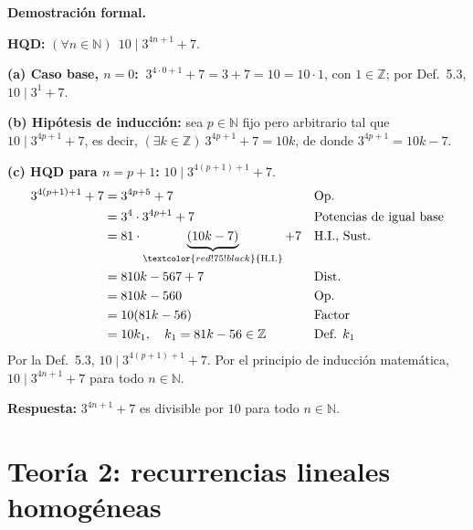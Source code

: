 \documentclass[11pt]{article}
\begin{document}
\textbf{Demostración formal.}

\textbf{HQD:} $(\forall n\in\mathbb N)\ \ 10\mid 3^{4n+1}+7$.

\textbf{(a) Caso base, $n=0$:} $\ 3^{4\cdot 0+1}+7=3+7=10=10\cdot 1$, con $1\in\mathbb Z$; por Def.~5.3, $10\mid 3^{1}+7$.

\textbf{(b) Hipótesis de inducción:} sea $p\in\mathbb N$ fijo pero arbitrario tal que $10\mid 3^{4p+1}+7$, es decir, $(\exists k\in\mathbb Z)\ 3^{4p+1}+7=10k$, de donde $3^{4p+1}=10k-7$.

\textbf{(c) HQD para $n=p+1$:} $10\mid 3^{4(p+1)+1}+7$.
\begin{align*}
3^{4(p+1)+1}+7 &= 3^{4p+5}+7 && \text{Op.}\\
&= 3^{4}\cdot 3^{4p+1}+7 && \text{Potencias de igual base}\\
&= 81\cdot\underbrace{(10k-7)}_{\textcolor{red!75!black}{\text{H.I.}}}+7 && \text{H.I., Sust.}\\
&= 810k-567+7 && \text{Dist.}\\
&= 810k-560 && \text{Op.}\\
&= 10(81k-56) && \text{Factor}\\
&= 10k_1,\quad k_1=81k-56\in\mathbb Z && \text{Def. } k_1
\end{align*}
Por la Def.~5.3, $10\mid 3^{4(p+1)+1}+7$. Por el principio de inducción matemática, $10\mid 3^{4n+1}+7$ para todo $n\in\mathbb N$.

\textbf{Respuesta:} $3^{4n+1}+7$ es divisible por $10$ para todo $n\in\mathbb N$.

\clearpage
\section*{Teoría 2: recurrencias lineales homogéneas}

\end{document}
